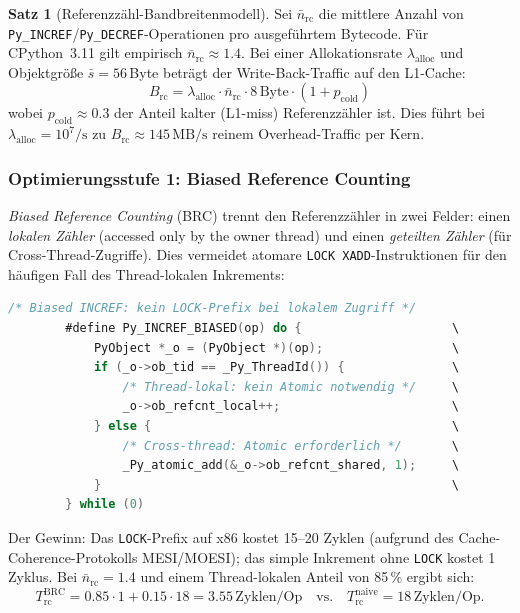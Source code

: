 ﻿\documentclass[a4paper,12pt]{scrreprt}
\theoremstyle{definition}
\newtheorem{satz}{Satz}[section]
\begin{document}
	\begin{satz}[Referenzzähl-Bandbreitenmodell]
		\label{satz:refcount_bw}
		Sei $\bar{n}_{\mathrm{rc}}$ die mittlere Anzahl von
		\texttt{Py\_INCREF}/\newline \texttt{Py\_DECREF}-Operationen pro
		ausgeführtem Bytecode. Für CPython~3.11 gilt empirisch
		$\bar{n}_{\mathrm{rc}} \approx 1.4$. Bei einer Allokationsrate
		$\lambda_{\mathrm{alloc}}$ und Objektgröße $\bar{s} = 56$\,Byte
		beträgt der Write-Back-Traffic auf den L1-Cache:
		\[
		B_{\mathrm{rc}} = \lambda_{\mathrm{alloc}} \cdot \bar{n}_{\mathrm{rc}}
		\cdot 8\,\mathrm{Byte} \cdot (1 + p_{\mathrm{cold}})
		\]
		wobei $p_{\mathrm{cold}} \approx 0.3$ der Anteil kalter (L1-miss)
		Referenzzähler ist. Dies führt bei $\lambda_{\mathrm{alloc}} = 10^7/\mathrm{s}$
		zu $B_{\mathrm{rc}} \approx 145\,\mathrm{MB/s}$ reinem Overhead-Traffic
		per Kern.
	\end{satz}
	
	\subsubsection{Optimierungsstufe 1: Biased Reference Counting}
	
	\emph{Biased Reference Counting} (BRC) \cite{shanBiased} trennt
	den Referenzzähler in zwei Felder: einen \emph{lokalen Zähler}
	(accessed only by the owner thread) und einen \emph{geteilten Zähler}
	(für Cross-Thread-Zugriffe). Dies vermeidet atomare
	\texttt{LOCK XADD}-Instruktionen für den häufigen Fall des
	Thread-lokalen Inkrements:
	
	\begin{lstlisting}[language=C, caption={Biased Reference Counting: lokales INCREF},
		label=lst:brc]
		/* Biased INCREF: kein LOCK-Prefix bei lokalem Zugriff */
		#define Py_INCREF_BIASED(op) do {                     \
			PyObject *_o = (PyObject *)(op);                  \
			if (_o->ob_tid == _Py_ThreadId()) {               \
				/* Thread-lokal: kein Atomic notwendig */     \
				_o->ob_refcnt_local++;                        \
			} else {                                          \
				/* Cross-thread: Atomic erforderlich */       \
				_Py_atomic_add(&_o->ob_refcnt_shared, 1);     \
			}                                                 \
		} while (0)
	\end{lstlisting}
	
	Der Gewinn: Das \texttt{LOCK}-Prefix auf x86 kostet 15--20 Zyklen
	(aufgrund des Cache-Coherence-Protokolls MESI/MOESI); das simple
	Inkrement ohne \texttt{LOCK} kostet 1 Zyklus. Bei
	$\bar{n}_{\mathrm{rc}} = 1.4$ und einem Thread-lokalen Anteil von
	85\,\% ergibt sich:
	\[
	T_{\mathrm{rc}}^{\mathrm{BRC}} = 0.85 \cdot 1 + 0.15 \cdot 18 = 3.55\,\text{Zyklen/Op}
	\quad \text{vs.} \quad T_{\mathrm{rc}}^{\mathrm{naive}} = 18\,\text{Zyklen/Op}.
	\]
	
\end{document}
